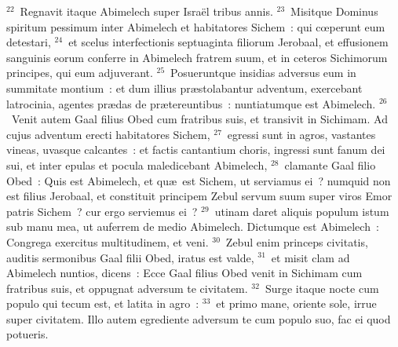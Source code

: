 ${}^{22}$~Regnavit itaque Abimelech super Isra\"el tribus annis.
${}^{23}$~Misitque Dominus spiritum pessimum inter Abimelech et habitatores Sichem~: qui cœperunt eum detestari,
${}^{24}$~et scelus interfectionis septuaginta filiorum Jerobaal, et effusionem sanguinis eorum conferre in Abimelech fratrem suum, et in ceteros Sichimorum principes, qui eum adjuverant.
${}^{25}$~Posueruntque insidias adversus eum in summitate montium~: et dum illius pr\ae stolabantur adventum, exercebant latrocinia, agentes pr\ae das de pr\ae tereuntibus~: nuntiatumque est Abimelech.
${}^{26}$~Venit autem Gaal filius Obed cum fratribus suis, et transivit in Sichimam. Ad cujus adventum erecti habitatores Sichem,
${}^{27}$~egressi sunt in agros, vastantes vineas, uvasque calcantes~: et factis cantantium choris, ingressi sunt fanum dei sui, et inter epulas et pocula maledicebant Abimelech,
${}^{28}$~clamante Gaal filio Obed~: Quis est Abimelech, et qu\ae\ est Sichem, ut serviamus ei~? numquid non est filius Jerobaal, et constituit principem Zebul servum suum super viros Emor patris Sichem~? cur ergo serviemus ei~?
${}^{29}$~utinam daret aliquis populum istum sub manu mea, ut auferrem de medio Abimelech. Dictumque est Abimelech~: Congrega exercitus multitudinem, et veni.
${}^{30}$~Zebul enim princeps civitatis, auditis sermonibus Gaal filii Obed, iratus est valde,
${}^{31}$~et misit clam ad Abimelech nuntios, dicens~: Ecce Gaal filius Obed venit in Sichimam cum fratribus suis, et oppugnat adversum te civitatem.
${}^{32}$~Surge itaque nocte cum populo qui tecum est, et latita in agro~:
${}^{33}$~et primo mane, oriente sole, irrue super civitatem. Illo autem egrediente adversum te cum populo suo, fac ei quod potueris.


